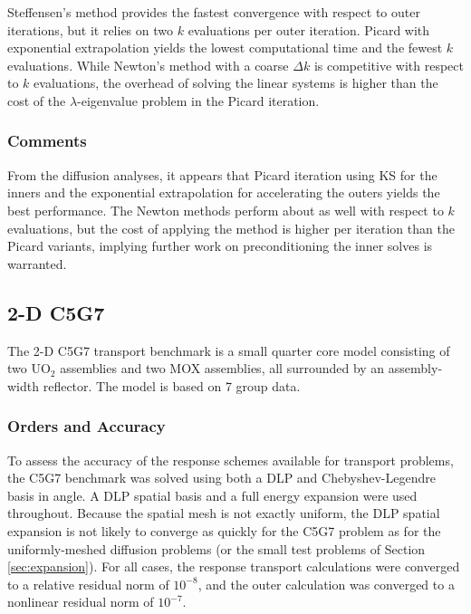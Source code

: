 Steffensen's method provides the fastest convergence with respect to 
outer iterations, but it relies on two $k$ evaluations per outer iteration.
Picard with exponential extrapolation yields the lowest computational 
time and the fewest $k$ evaluations.  While Newton's method with a 
coarse $\Delta k$ is competitive with respect to $k$ evaluations, the 
overhead of solving the linear systems is higher than the cost of the 
$\lambda$-eigenvalue problem in the Picard iteration.


\subsubsection{Comments}

From the diffusion analyses, it appears that Picard iteration using 
KS for the inners and the exponential extrapolation for accelerating 
the outers yields the best performance.  The Newton methods perform 
about as well with respect to $k$ evaluations, but the cost of 
applying the method is higher per iteration than the Picard variants,
implying further work on preconditioning the inner solves is warranted.

\subsection{2-D C5G7}

The 2-D C5G7 transport benchmark is a small quarter core 
model consisting of two UO$_2$ assemblies and two MOX
assemblies, all surrounded by an assembly-width reflector.  The model 
is based on 7 group data.
 
\subsubsection{Orders and Accuracy}
 
To assess the accuracy of the response schemes available for transport 
problems, the C5G7 benchmark was solved using both a DLP and 
Chebyshev-Legendre basis in angle. A DLP spatial basis and a full 
energy expansion were used throughout.  Because the 
spatial mesh is not exactly uniform, the DLP spatial expansion is not 
likely to converge as quickly for the C5G7 problem as for the 
uniformly-meshed diffusion problems (or the small test problems
of Section \ref{sec:expansion}).  For all cases, 
the response transport calculations were converged to 
a relative residual norm of $10^{-8}$, and the outer calculation was 
converged to a nonlinear residual norm of $10^{-7}$.

